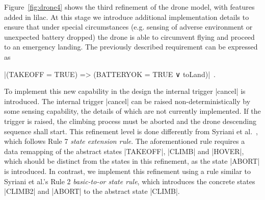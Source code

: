 Figure~\ref{fig:drone4} shows the third refinement of the drone model, with features added in lilac.
At this stage we introduce additional implementation details to ensure that under special 
circumstances (e.g. sensing of adverse environment or unexpected battery dropped) the drone is able 
to circumvent flying and proceed to an emergency landing. The previously described requirement can be
expressed as
\begin{center}
  |(TAKEOFF = TRUE) => (BATTERYOK = TRUE ∨ toLand)|~.
\end{center}
To implement this new capability in the design the internal trigger |cancel| is introduced.
The internal trigger |cancel| can be raised non-deterministically by some sensing capability, 
the details of which are not currently implemented. If the trigger is raised, the climbing process 
must be aborted and the drone descending sequence shall start. This refinement level is done differently 
from Syriani et al.~\cite{Syriani_2019}, which follows Rule 7 \emph{state extension rule}. 
The aforementioned rule requires a data remapping of the abstract states |TAKEOFF|, |CLIMB| and |HOVER|,
which should be distinct from the states in this refinement, as the state |ABORT| is introduced.
In contrast, we implement this refinement using a rule similar to Syriani et al.'s 
Rule 2 \emph{basic-to-or state rule}, which introduces the concrete states |CLIMB2| and |ABORT| 
to the abstract state |CLIMB|.




